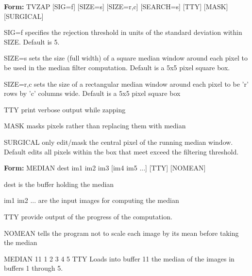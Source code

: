 {\newpage\clearpage
{}%
\begin{command}
  \item[\textbf{Form: }TVZAP {[SIG=f]} {[SIZE=s]} {[SIZE=r,c]} 
       {[SEARCH=s]} {[TTY]} {[MASK]} {[SURGICAL]}\hfill]{}
  \item[SIG=f]{specifies the rejection threshold in units
       of the standard deviation within SIZE.  Default is 5}.
  \item[SIZE=s]{sets the size (full width) of a square median
       window around each pixel to be used in the median filter
       computation.  Default is a 5x5 pixel square box.}
  \item[SIZE=r,c]{sets the size of a rectangular median window
       around each pixel to be 'r' rows by 'c' columns wide.  Default
       is a 5x5 pixel square box}
  \item[TTY]{print verbose output while zapping}
  \item[MASK]{masks pixels rather than replacing them with median}
  \item[SURGICAL]{only edit/mask the central pixel of the running
       median window.  Default edits all pixels within the box that
       meet exceed the filtering threshold.}
\end{command}%
\lthtmlfigureZ
\lthtmlcheckvsize\clearpage}

{\newpage\clearpage
{}%
\begin{command}
  \item[\textbf{Form: }MEDIAN dest im1 im2 im3 {[im4 im5 ...]} {[TTY]} 
       {[NOMEAN]}\hfill]{}
  \item[dest]{is the buffer holding the median}
  \item[im1 im2 ...]{are the input images for computing the median}
  \item[TTY]{provide output of the progress of the computation.}
  \item[NOMEAN]{tells the program not to scale each image by
       its mean before taking the median}
\end{command}%
\lthtmlfigureZ
\lthtmlcheckvsize\clearpage}

{\newpage\clearpage
{}%
\begin{example}
  \item[MEDIAN 11 1 2 3 4 5 TTY\hfill]{Loads into buffer 11 the median 
       of the images in buffers 1 through 5.}
\end{example}%
\lthtmlfigureZ
\lthtmlcheckvsize\clearpage}

